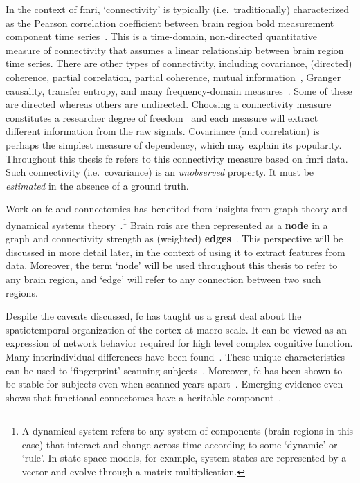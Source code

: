 In the context of \gls{fmri}, `connectivity' is typically (i.e.~traditionally) characterized as the Pearson correlation coefficient between brain region \gls{bold} measurement component time series~\parencite{Zalesky2012}.
This is a time-domain, non-directed quantitative measure of connectivity that assumes a linear relationship between brain region time series.
There are other types of connectivity, including covariance, (directed) coherence, partial correlation, partial coherence, mutual information~\parencite[see e.g.][chapter 2]{Cover2005}, Granger causality, transfer entropy, and many frequency-domain measures~\parencite[see][for reviews]{Wang2014, VanDiessen2015, Bastos2016, Foti2019}.
Some of these are directed whereas others are undirected.
Choosing a connectivity measure constitutes a researcher degree of freedom~\parencite{Gelman2013} and each measure will extract different information from the raw signals.
%
Covariance (and correlation) is perhaps the simplest measure of dependency, which may explain its popularity.
Throughout this thesis \gls{fc} refers to this connectivity measure based on \gls{fmri} data.
Such connectivity (i.e.~covariance) is an \emph{unobserved} property.
It must be \emph{estimated} in the absence of a ground truth.

Work on \gls{fc} and connectomics has benefited from insights from graph theory and dynamical systems theory~\parencite{Bassett2017, Betzel2022}.\footnote{A dynamical system refers to any system of components (brain regions in this case) that interact and change across time according to some `dynamic' or `rule'. In state-space models, for example, system states are represented by a vector and evolve through a matrix multiplication.}
Brain \glspl{roi} are then represented as a \textbf{node} in a graph and connectivity strength as (weighted) \textbf{edges}~\parencite[i.e.~node-pairs, see also][]{Ryyppo2018}.
This perspective will be discussed in more detail later, in the context of using it to extract features from data.
Moreover, the term `node' will be used throughout this thesis to refer to any brain region, and `edge' will refer to any connection between two such regions.

Despite the caveats discussed, \gls{fc} has taught us a great deal about the spatiotemporal organization of the cortex at macro-scale.
It can be viewed as an expression of network behavior required for high level complex cognitive function.
%
Many interindividual differences have been found~\parencite{Liegeois2019}.
These unique characteristics can be used to `fingerprint' scanning subjects~\parencite{Finn2015}.
Moreover, \gls{fc} has been shown to be stable for subjects even when scanned years apart~\parencite{Guo2012}.
Emerging evidence even shows that functional connectomes have a heritable component~\parencite{Jun2022}.
